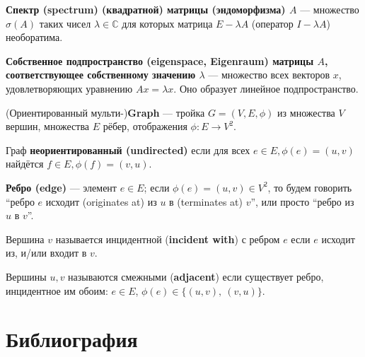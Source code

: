 \documentclass[14pt,a4paper]{extarticle}
\theoremstyle{definition}
\begin{document}
\textbf{Спектр (spectrum) (квадратной) матрицы (эндоморфизма) \( A \)} ---
множество \( \sigma(A) \) таких чисел \( \lambda\in\mathbb{C} \)
для которых матрица \( E - \lambda A \) (оператор \( I - \lambda A \))
необоратима.

\textbf{Собственное подпространство (eigenspace, Eigenraum)
  матрицы \( A \), соответствующее собственному значению \( \lambda \)}
--- множество всех векторов \( x \), удовлетворяющих уравнению \( Ax = \lambda
x\). Оно образует линейное подпространство.

(Ориентированный мульти-)\textbf{Graph} --- тройка \(G = (V, E, \phi)\)
из множества \( V \) вершин, множества \( E \) рёбер,
отображения \( \phi: E\to V^2\).

Граф \textbf{неориентированный (undirected)} если для всех \( e\in E, \phi(e)=(u, v)\)
найдётся \( f\in E, \phi(f)=(v, u) \).

\textbf{Ребро (edge)} --- элемент \( e\in E \); если \( \phi(e) = (u, v)\in V^2 \),
то будем говорить ``ребро \( e \) исходит (originates at) из \( u \) в
(terminates at) \( v \)'', или просто ``ребро из \( u \) в \( v \)''.

Вершина \( v \) называется инцидентной (\textbf{incident with}) с ребром \( e \)
если \( e \) исходит из, и/или входит в \( v \).

Вершины \( u, v\) называются смежными (\textbf{adjacent})
если существует ребро, инцидентное им обоим: \( e\in E \),
\( \phi(e)\in\{(u, v),\ (v, u) \}\).
\newpage
\section{Библиография}
\nocite{*}
\printbibliography[heading=none]
\end{document}

